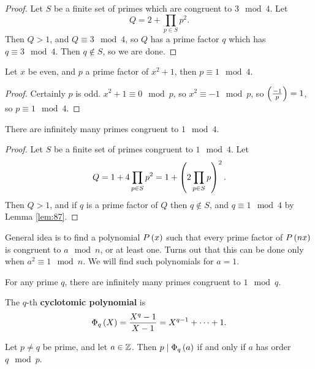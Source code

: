 \begin{proof}
Let $ S $ be a finite set of primes which are congruent to $ 3 \mod 4 $. Let
$$ Q = 2 + \prod_{p \in S} p^2. $$
Then $ Q > 1 $, and $ Q \equiv 3 \mod 4 $, so $ Q $ has a prime factor $ q $ which has $ q \equiv 3 \mod 4 $. Then $ q \notin S $, so we are done.
\end{proof}

\begin{lemma}
\label{lem:87}
Let $ x $ be even, and $ p $ a prime factor of $ x^2 + 1 $, then $ p \equiv 1 \mod 4 $.
\end{lemma}

\begin{proof}
Certainly $ p $ is odd. $ x^2 + 1 \equiv 0 \mod p $, so $ x^2 \equiv -1 \mod p $, so $ \left( \tfrac{-1}{p} \right) = 1 $, so $ p \equiv 1 \mod 4 $.
\end{proof}

\begin{theorem}
There are infinitely many primes congruent to $ 1 \mod 4 $.
\end{theorem}

\begin{proof}
Let $ S $ be a finite set of primes congruent to $ 1 \mod 4 $. Let
$$ Q = 1 + 4\prod_{p \in S} p^2 = 1 + \left( 2\prod_{p \in S} p \right)^2. $$
Then $ Q > 1 $, and if $ q $ is a prime factor of $ Q $ then $ q \notin S $, and $ q \equiv 1 \mod 4 $ by Lemma \ref{lem:87}.
\end{proof}

General idea is to find a polynomial $ P\left( x \right) $ such that every prime factor of $ P\left( nx \right) $ is congruent to $ a \mod n $, or at least one. Turns out that this can be done only when $ a^2 \equiv 1 \mod n $. We will find such polynomials for $ a = 1 $.

\begin{theorem}
For any prime $ q $, there are infinitely many primes congruent to $ 1 \mod q $.
\end{theorem}

\begin{definition}
The $ q $-th \textbf{cyclotomic polynomial} is
$$ \Phi_q\left( X \right) = \dfrac{X^q - 1}{X - 1} = X^{q - 1} + \dots + 1. $$
\end{definition}

\begin{theorem}
\label{thm:91}
Let $ p \ne q $ be prime, and let $ a \in \mathbb{Z} $. Then $ p \mid \Phi_q\left( a \right) $ if and only if $ a $ has order $ q \mod p $.
\end{theorem}

